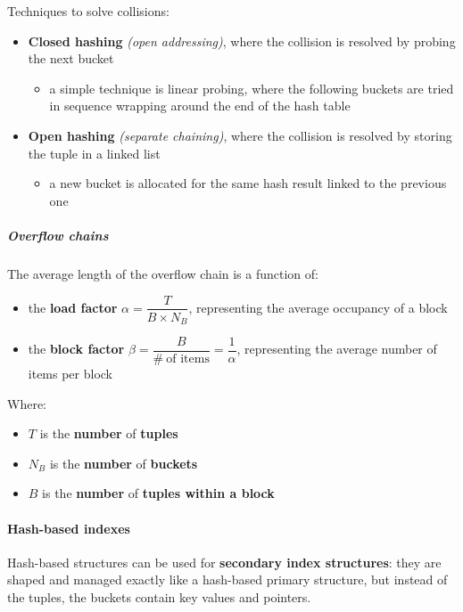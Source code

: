 \documentclass[english]{article}
\begin{document}
Techniques to solve collisions:

\begin{itemize}
  \item \textbf{Closed hashing} \textit{(open addressing)}, where the collision is resolved by probing the next bucket
        \begin{itemize}[label=\(\rightarrow\)]
          \item a simple technique is linear probing, where the following buckets are tried in sequence wrapping around the end of the hash table
        \end{itemize}
  \item \textbf{Open hashing} \textit{(separate chaining)}, where the collision is resolved by storing the tuple in a linked list
        \begin{itemize}[label=\(\rightarrow\)]
          \item a new bucket is allocated for the same hash result linked to the previous one
        \end{itemize}
\end{itemize}

\subparagraph*{Overflow chains}
The average length of the overflow chain is a function of:

\begin{itemize}[itemsep=0.5ex]
  \item the \textbf{load factor} \(\alpha = \dfrac{T}{B \times N_B}\), representing the average occupancy of a block
  \item the \textbf{block factor} \(\beta = \dfrac{B}{\# \ \text{of items}} = \dfrac{1}{\alpha}\), representing the average number of items per block
\end{itemize}

Where:

\begin{itemize}
  \item \(T\) is the \textbf{number} of \textbf{tuples}
  \item \(N_B\) is the \textbf{number} of \textbf{buckets}
  \item \(B\) is the \textbf{number} of \textbf{tuples within a block}
\end{itemize}

\paragraph{Hash-based indexes}

Hash-based structures can be used for \textbf{secondary index structures}:
they are shaped and managed exactly like a hash-based primary structure, but instead of the tuples, the buckets contain key values and pointers.
\end{document}

